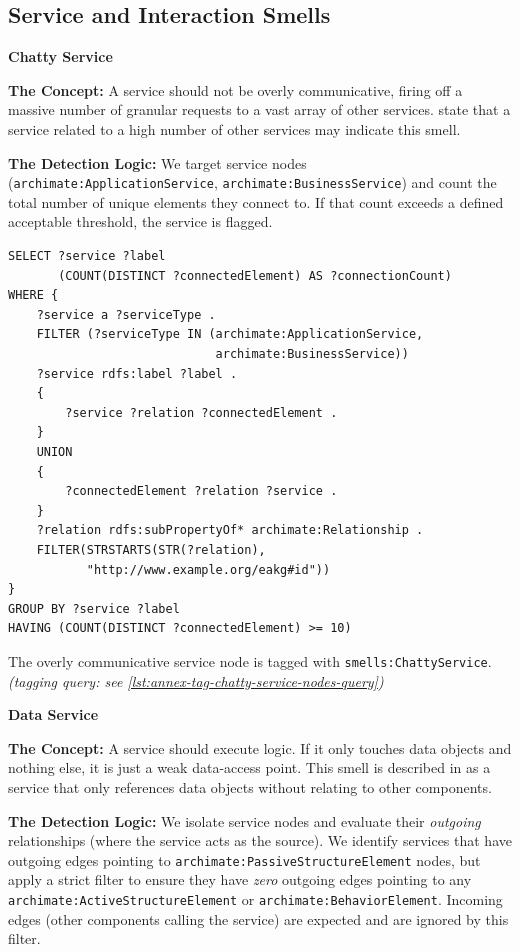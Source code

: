 \subsection{Service and Interaction Smells}
\label{subsec:service-smells}

\noindent\textbf{Chatty Service}\par

\textbf{The Concept:} A service should not be overly communicative, firing off a massive number of granular requests to a vast array of other services. \parencite{salentin2020smells} state that a service related to a high number of other services may indicate this smell.

\textbf{The Detection Logic:} We target service nodes (\texttt{archimate:ApplicationService}, \texttt{archimate:BusinessService}) and count the total number of unique elements they connect to. If that count exceeds a defined acceptable threshold, the service is flagged.

\begin{lstlisting}[caption={Detect chatty services (threshold: 10 connections)}]
SELECT ?service ?label
       (COUNT(DISTINCT ?connectedElement) AS ?connectionCount)
WHERE {
    ?service a ?serviceType .
    FILTER (?serviceType IN (archimate:ApplicationService,
                             archimate:BusinessService))
    ?service rdfs:label ?label .
    {
        ?service ?relation ?connectedElement .
    }
    UNION
    {
        ?connectedElement ?relation ?service .
    }
    ?relation rdfs:subPropertyOf* archimate:Relationship .
    FILTER(STRSTARTS(STR(?relation),
           "http://www.example.org/eakg#id"))
}
GROUP BY ?service ?label
HAVING (COUNT(DISTINCT ?connectedElement) >= 10)
\end{lstlisting}

The overly communicative service node is tagged with \texttt{smells:ChattyService}. \textit{(tagging query: see \autoref{lst:annex-tag-chatty-service-nodes-query})}

\noindent\textbf{Data Service}\par

\textbf{The Concept:} A service should execute logic. If it only touches data objects and nothing else, it is just a weak data-access point. This smell is described in \parencite{salentin2020smells} as a service that only references data objects without relating to other components.

\textbf{The Detection Logic:} We isolate service nodes and evaluate their \emph{outgoing} relationships (where the service acts as the source). We identify services that have outgoing edges pointing to \texttt{archimate:PassiveStructureElement} nodes, but apply a strict filter to ensure they have \emph{zero} outgoing edges pointing to any \texttt{archimate:ActiveStructureElement} or \texttt{archimate:BehaviorElement}. Incoming edges (other components calling the service) are expected and are ignored by this filter.

